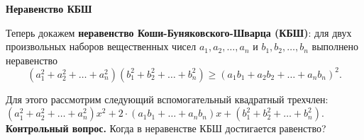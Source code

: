 \documentclass{article}
\begin{document}
    \large


    \begin{center}
        \textbf{Неравенство КБШ}
    \end{center}

    Теперь докажем \textbf{неравенство Коши-Буняковского-Шварца (КБШ)}: для двух произвольных наборов вещественных чисел $a_1, a_2, \ldots, a_n$ и $b_1, b_2, \ldots, b_n$ выполнено неравенство
    \[
        (a_1^2+a_2^2+\ldots+a_n^2)(b_1^2+b_2^2+\ldots+b_n^2) \geqslant (a_{1}b_1+a_{2}b_2+\ldots+a_{n}b_n)^2.
    \]

    Для этого рассмотрим следующий вспомогательный квадратный трехчлен: $(a_1^2+a_2^2+\ldots+a_n^2)x^2+2\cdot(a_{1}b_1+\ldots+a_{n}b_n)x+(b_1^2+b_2^2+\ldots+b_n^2)$.
    \textbf{Контрольный вопрос.} Когда в неравенстве КБШ достигается равенство?
\end{document}
